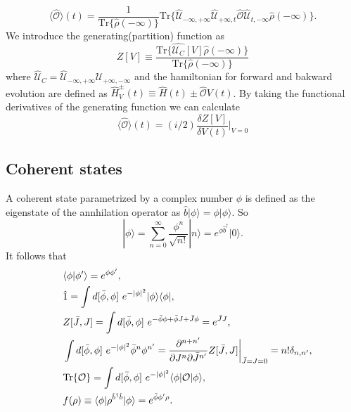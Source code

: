 \documentclass[a4paper, 12pt]{article}
\begin{document}
\begin{equation}
\langle \hat{\mathcal{O}} \rangle (t)  = \frac{1}{\mathrm{Tr}\{\hat{\rho}(-\infty)\}} \mathrm{Tr}\{\hat{\mathcal{U}}_{-\infty,+\infty} \hat{\mathcal{U}}_{+\infty,t} \hat{\mathcal{O}} \hat{\mathcal{U}}_{t,-\infty} \hat{\rho}(-\infty)  \}.
\end{equation}
We introduce the generating(partition) function as
\begin{equation}
Z[V] \equiv \frac{\mathrm{Tr}\{\hat{\mathcal{U}_C}[V]\hat{\rho}(-\infty)\}}{\mathrm{Tr}\{\hat{\rho}(-\infty)\}}
\end{equation}
where $\hat{\mathcal{U}}_C = \hat{\mathcal{U}}_{-\infty , +\infty} \hat{\mathcal{U}}_{+\infty , -\infty}$ and the hamiltonian for forward and bakward evolution are defined as $\hat{H}^{\pm}_V (t) \equiv \hat{H}(t) \pm \hat{\mathcal{O}}V(t)$. By taking the functional derivatives of the generating function we can calculate
\begin{equation}
\langle \hat{\mathcal{O}} \rangle (t) =(i/2)\frac{\delta Z[V]}{\delta V(t)} \bigg|_{V=0}
\end{equation}


\subsection {Coherent states}
A coherent state parametrized by a complex number $\phi$ is defined as the eigenstate of the annhilation operator  as $\hat{b} |\phi\rangle = \phi |\phi\rangle$. So
\begin{equation}
|\phi\rangle = \sum_{n=0}^{\infty} \frac{\phi^n}{\sqrt{n!}}|n\rangle = e^{\phi \hat{b}^\dagger}|0\rangle.
\end{equation}
It follows that
\begin{equation}
\begin{split}
&\quad \langle\phi|\phi'\rangle = e^{\phi \phi'}, \\
&\quad \hat{1} = \int d[\bar{\phi},\phi]\*\ e^{-|\phi|^2} |\phi\rangle \langle\phi| ,\\
 &\quad Z[\bar{J},J] = \int d[\bar{\phi},\phi]\*\ e^{-\bar{\phi}\phi + \bar{\phi}J + \bar{J}\phi} = e^{\bar{J}J},\\
&\quad \int d[\bar{\phi},\phi]\*\ e^{-|\phi|^2} \bar{\phi}^n\phi^{n'} = \frac{\partial^{n+n'}}{\partial J^n \partial \bar{J}^{n'}} Z[\bar{J},J] \bigg|_{\bar{J}=J=0} = n! \delta_{n,n'},\\
&\quad \mathrm{Tr}\{\mathcal{O}\} = \int d[\bar{\phi},\phi]\*\ e^{-|\phi|^2} \langle\phi|\mathcal{O}|\phi\rangle,\\
&\quad f(\rho) \equiv \langle\phi|\rho^{\hat{b}^{\dagger} \hat{b}}|\phi\rangle = e^{\bar{\phi} \phi' \rho}.
\end{split}
\end{equation}
\end{document}
